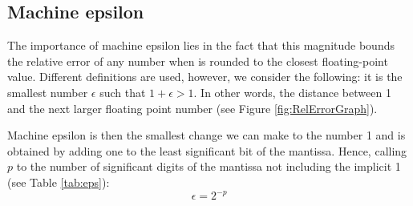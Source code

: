 

        \FloatBarrier
        \subsection{Machine epsilon}

The importance of machine epsilon lies in the fact that this magnitude bounds the 
relative error of any number when is rounded to the closest floating-point value. 
Different definitions are used, however, we consider the following: 
it is the smallest number $\epsilon$ such that $1 + \epsilon > 1$. 
In other words, the distance between 1 and the next larger floating point number (see Figure \ref{fig:RelErrorGraph}).

Machine epsilon is then the smallest change we can make to the number 1 and is obtained by adding one to the least significant bit of the mantissa. 
Hence, calling $p$ to the number of significant digits of the mantissa not including the implicit 1 (see Table \ref{tab:eps}):
$$
\epsilon = 2^{-p}
$$ 

